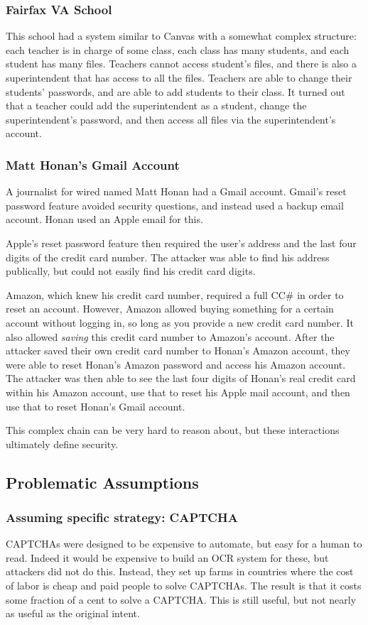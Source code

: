 \subsubsection{Fairfax VA School}
This school had a system similar to Canvas with a somewhat complex structure: each teacher is in charge of some class, each class has many students, and each student has many files. Teachers cannot access student's files, and there is also a superintendent that has access to all the files. Teachers are able to change their students' passwords, and are able to add students to their class. It turned out that a teacher could add the superintendent as a student, change the superintendent's password, and then access all files via the superintendent's account.

\subsubsection{Matt Honan's Gmail Account}
A journalist for wired named Matt Honan had a Gmail account. Gmail's reset password feature avoided security questions, and instead used a backup email account. Honan used an Apple email for this.

Apple's reset password feature then required the user's address and the last four digits of the credit card number. The attacker was able to find his address publically, but could not easily find his credit card digits.

Amazon, which knew his credit card number, required a full CC\# in order to reset an account. However, Amazon allowed buying something for a certain account without logging in, so long as you provide a new credit card number. It also allowed \textit{saving} this credit card number to Amazon's account. After the attacker saved their own credit card number to Honan's Amazon account, they were able to reset Honan's Amazon password and access his Amazon account. The attacker was then able to see the last four digits of Honan's real credit card within his Amazon account, use that to reset his Apple mail account, and then use that to reset Honan's Gmail account.

This complex chain can be very hard to reason about, but these interactions ultimately define security.

\subsection{Problematic Assumptions}
\subsubsection{Assuming specific strategy: CAPTCHA}
CAPTCHAs were designed to be expensive to automate, but easy for a human to read. Indeed it would be expensive to build an OCR system for these, but attackers did not do this. Instead, they set up farms in countries where the cost of labor is cheap and paid people to solve CAPTCHAs. The result is that it costs some fraction of a cent to solve a CAPTCHA. This is still useful, but not nearly as useful as the original intent.

